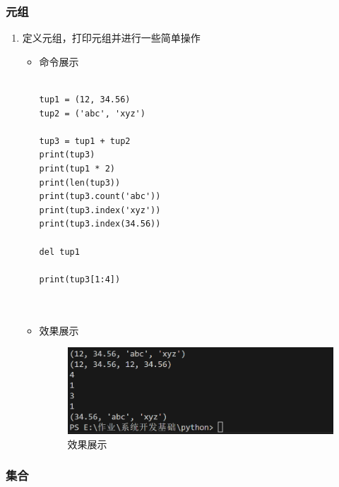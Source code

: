 \documentclass[UTF8]{ctexart}
\begin{document}
\subsubsection{元组}

\begin{enumerate}
  \item 定义元组，打印元组并进行一些简单操作
  \begin{itemize}
  \item 命令展示
  \begin{verbatim}

tup1 = (12, 34.56)
tup2 = ('abc', 'xyz')

tup3 = tup1 + tup2
print(tup3)
print(tup1 * 2)
print(len(tup3))
print(tup3.count('abc'))
print(tup3.index('xyz'))
print(tup3.index(34.56))

del tup1

print(tup3[1:4])

    
  \end{verbatim}

  \item 效果展示
  \begin{figure}[H]
    \centering
    \includegraphics[width=\textwidth]{22} %
    \caption{效果展示}
  
  \end{figure}
\end{itemize}
\end{enumerate}




















\subsubsection{集合}
\end{document}
